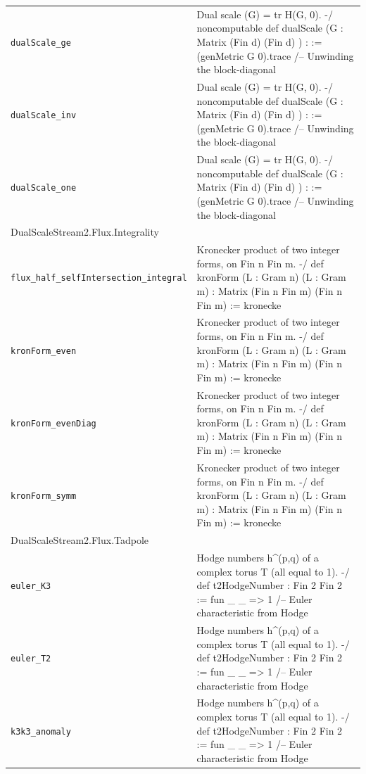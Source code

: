 \begin{longtable}{p{}p{}}
\quad\texttt{\footnotesize dualScale\_ge} & {\footnotesize Dual scale (G) = tr H(G, 0). -/ noncomputable def dualScale (G : Matrix (Fin d) (Fin d) ) :  := (genMetric G 0).trace /-- Unwinding the block-diagonal} \\
\quad\texttt{\footnotesize dualScale\_inv} & {\footnotesize Dual scale (G) = tr H(G, 0). -/ noncomputable def dualScale (G : Matrix (Fin d) (Fin d) ) :  := (genMetric G 0).trace /-- Unwinding the block-diagonal} \\
\quad\texttt{\footnotesize dualScale\_one} & {\footnotesize Dual scale (G) = tr H(G, 0). -/ noncomputable def dualScale (G : Matrix (Fin d) (Fin d) ) :  := (genMetric G 0).trace /-- Unwinding the block-diagonal} \\
\multicolumn{2}{l}{\textsf{\small DualScaleStream2.Flux.Integrality}} \\
\quad\texttt{\footnotesize flux\_half\_selfIntersection\_integral} & {\footnotesize Kronecker product of two integer forms, on Fin n  Fin m. -/ def kronForm (L : Gram n) (L : Gram m) : Matrix (Fin n  Fin m) (Fin n  Fin m)  := kronecke} \\
\quad\texttt{\footnotesize kronForm\_even} & {\footnotesize Kronecker product of two integer forms, on Fin n  Fin m. -/ def kronForm (L : Gram n) (L : Gram m) : Matrix (Fin n  Fin m) (Fin n  Fin m)  := kronecke} \\
\quad\texttt{\footnotesize kronForm\_evenDiag} & {\footnotesize Kronecker product of two integer forms, on Fin n  Fin m. -/ def kronForm (L : Gram n) (L : Gram m) : Matrix (Fin n  Fin m) (Fin n  Fin m)  := kronecke} \\
\quad\texttt{\footnotesize kronForm\_symm} & {\footnotesize Kronecker product of two integer forms, on Fin n  Fin m. -/ def kronForm (L : Gram n) (L : Gram m) : Matrix (Fin n  Fin m) (Fin n  Fin m)  := kronecke} \\
\multicolumn{2}{l}{\textsf{\small DualScaleStream2.Flux.Tadpole}} \\
\quad\texttt{\footnotesize euler\_K3} & {\footnotesize Hodge numbers h\^{}(p,q) of a complex torus T (all equal to 1). -/ def t2HodgeNumber : Fin 2  Fin 2   := fun \_ \_ => 1 /-- Euler characteristic from Hodge} \\
\quad\texttt{\footnotesize euler\_T2} & {\footnotesize Hodge numbers h\^{}(p,q) of a complex torus T (all equal to 1). -/ def t2HodgeNumber : Fin 2  Fin 2   := fun \_ \_ => 1 /-- Euler characteristic from Hodge} \\
\quad\texttt{\footnotesize k3k3\_anomaly} & {\footnotesize Hodge numbers h\^{}(p,q) of a complex torus T (all equal to 1). -/ def t2HodgeNumber : Fin 2  Fin 2   := fun \_ \_ => 1 /-- Euler characteristic from Hodge} \\

\end{longtable}
